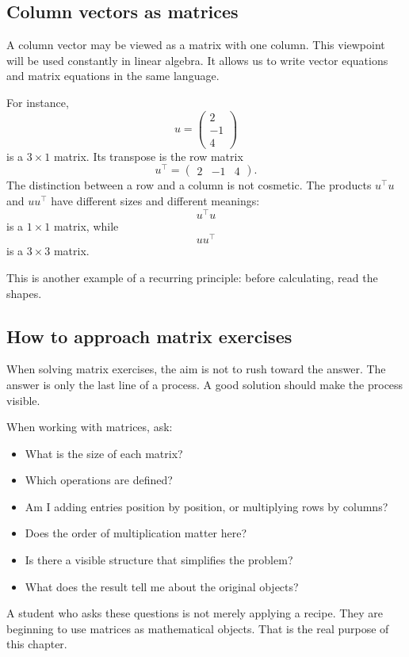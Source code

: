 \subsection*{Column vectors as matrices}

A column vector may be viewed as a matrix with one column. This viewpoint will be used constantly in linear algebra. It allows us to write vector equations and matrix equations in the same language.

For instance,
\[
u=
\begin{pmatrix}
2\\ -1\\ 4
\end{pmatrix}
\]
is a \(3\times 1\) matrix. Its transpose is the row matrix
\[
u^{\top}=\begin{pmatrix}2 & -1 & 4\end{pmatrix}.
\]
The distinction between a row and a column is not cosmetic. The products \(u^{\top}u\) and \(uu^{\top}\) have different sizes and different meanings:
\[
u^{\top}u
\]
is a \(1\times 1\) matrix, while
\[
u u^{\top}
\]
is a \(3\times 3\) matrix.

This is another example of a recurring principle: before calculating, read the shapes.

\subsection*{How to approach matrix exercises}

When solving matrix exercises, the aim is not to rush toward the answer. The answer is only the last line of a process. A good solution should make the process visible.

\begin{summarybox}
When working with matrices, ask:
\begin{itemize}
\item What is the size of each matrix?
\item Which operations are defined?
\item Am I adding entries position by position, or multiplying rows by columns?
\item Does the order of multiplication matter here?
\item Is there a visible structure that simplifies the problem?
\item What does the result tell me about the original objects?
\end{itemize}
\end{summarybox}

A student who asks these questions is not merely applying a recipe. They are beginning to use matrices as mathematical objects. That is the real purpose of this chapter.

